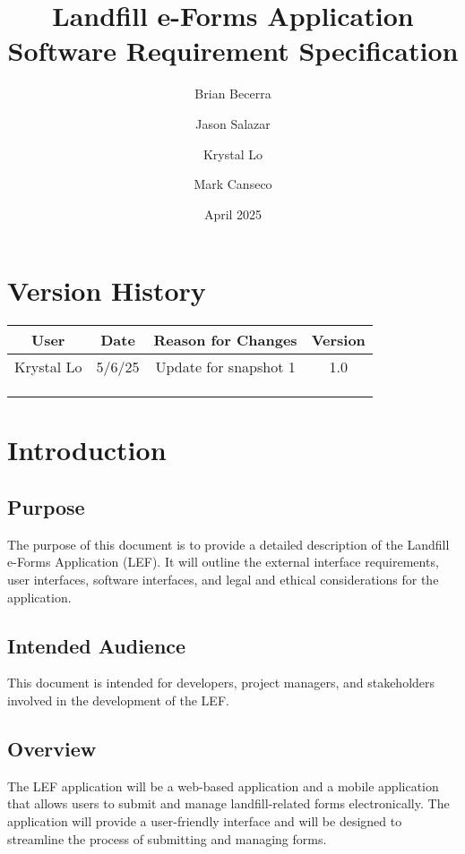 \documentclass[12pt]{article}
\title{Landfill e-Forms Application\\
Software Requirement Specification}
\author{
    Brian Becerra\\
    \and
    Jason Salazar\\
    \and
    Krystal Lo\\
    \and
    Mark Canseco\\
    }
\date{April 2025}
\begin{document}
\begin{titlepage}
\maketitle
\thispagestyle{empty}
\end{titlepage}

\thispagestyle{empty}
\tableofcontents
\newpage

\section*{Version History}
\begin{table}[ht]
    \centering
    \begin{tabular}{|c|c|c|c|}
    \hline
    \textbf{User} & \textbf{Date} & \textbf{Reason for Changes} & \textbf{Version}\\
    \hline
         Krystal Lo & 5/6/25  & Update for snapshot 1 & 1.0\\
    \hline
         &  &  & \\
    \hline
         &  &  & \\
    \hline
         &  &  & \\
    \hline
    \end{tabular}
\end{table}
\newpage

\section{Introduction}
\subsection{Purpose}
The purpose of this document is to provide a detailed description of the Landfill e-Forms Application (LEF). It will outline the external interface requirements, user interfaces, software interfaces, and legal and ethical considerations for the application. 
\subsection{Intended Audience}
This document is intended for developers, project managers, and stakeholders involved in the development of the LEF.
\subsection{Overview}
The LEF application will be a web-based application and a mobile application that allows users to submit and manage landfill-related forms electronically. The application will provide a user-friendly interface and will be designed to streamline the process of submitting and managing forms.
\newpage
\end{document}
